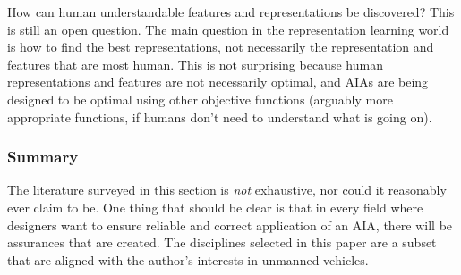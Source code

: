     How can human understandable features and representations be discovered? This is still an open question. The main question in the representation learning world is how to find the best representations, not necessarily the representation and features that are most human. This is not surprising because human representations and features are not necessarily optimal, and AIAs are being designed to be optimal using other objective functions (arguably more appropriate functions, if humans don't need to understand what is going on).
%
%
%

\subsubsection{Summary}
    The literature surveyed in this section is \emph{not} exhaustive, nor could it reasonably ever claim to be. One thing that should be clear is that in every field where designers want to ensure reliable and correct application of an AIA, there will be assurances that are created. The disciplines selected in this paper are a subset that are aligned with the author's interests in unmanned vehicles.
    

